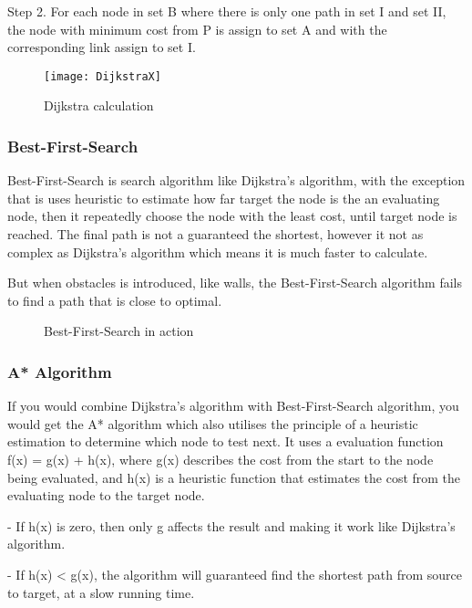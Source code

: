   Step 2. For each node in set B where there is only one path in set I and set II, the node with minimum cost from P is assign to set A and with the corresponding link assign to set I.

  \begin{figure}[ht!]
    \centering
    \texttt{[image: DijkstraX]}
    \caption{Dijkstra calculation}
    \label{overflow}
  \end{figure}

  \subsubsection{Best-First-Search}

  Best-First-Search is search algorithm like Dijkstra's algorithm, with the exception that is uses heuristic to estimate how far target the node is the an evaluating node, then it repeatedly choose the node with the least cost, until target node is reached. The final path is not a guaranteed the shortest, however it not as complex as Dijkstra's algorithm which means it is much faster to calculate. \cite{BestFirst}

  But when obstacles is introduced, like walls, the Best-First-Search algorithm fails to find a path that is close to optimal.

  \begin{figure}[ht!]
    \centering
    \caption{Best-First-Search in action}
    \label{overflow}
  \end{figure}

  \subsubsection{A* Algorithm}

  If you would combine Dijkstra's algorithm with Best-First-Search algorithm, you would get the A* algorithm which also utilises the principle of a heuristic estimation to determine which node to test next. It uses a evaluation function f(x) = g(x) + h(x), where g(x) describes the cost from the start to the node being evaluated, and h(x) is a heuristic function that estimates the cost from the evaluating node to the target node. \cite{http://theory.stanford.edu/}

  - If h(x) is zero, then only g affects the result and making it work like Dijkstra's algorithm.

  - If h(x) < g(x), the algorithm will guaranteed find the shortest path from source to target, at a slow running time.

